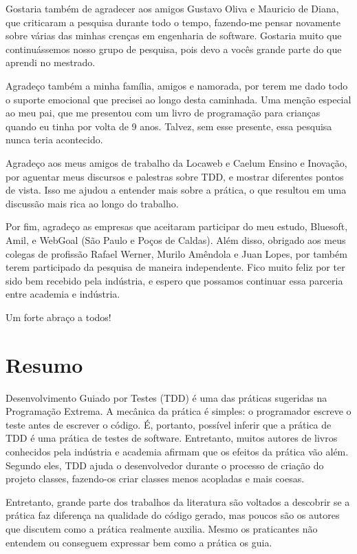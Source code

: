 \documentclass[11pt,openany,twoside,a4paper]{book}
\begin{document}
Gostaria também de agradecer aos amigos Gustavo Oliva e Mauricio de Diana, que
criticaram a pesquisa durante todo o tempo, fazendo-me pensar novamente sobre
várias das minhas crenças em engenharia de software. Gostaria muito que continuássemos
nosso grupo de pesquisa, pois devo a vocês grande parte do que aprendi no mestrado.

Agradeço também a minha família, amigos e namorada, por terem me dado todo o suporte
emocional que precisei ao longo desta caminhada. Uma menção especial ao meu pai,
que me presentou com um livro de programação para crianças quando eu tinha por volta
de 9 anos. Talvez, sem esse presente, essa pesquisa nunca teria acontecido.

Agradeço aos meus amigos de trabalho da Locaweb e Caelum Ensino e Inovação, 
por aguentar meus discursos e palestras sobre TDD, e mostrar diferentes
pontos de vista. Isso me ajudou a entender mais sobre a prática, o que resultou
em uma discussão mais rica ao longo do trabalho.

Por fim, agradeço as empresas que aceitaram participar do meu estudo, Bluesoft,
Amil, e WebGoal (São Paulo e Poços de Caldas). Além disso, obrigado aos meus colegas
de profissão Rafael Werner, Murilo Amêndola e Juan Lopes, por também terem
participado da pesquisa de maneira independente. Fico muito feliz por ter sido
bem recebido pela indústria, e espero que possamos continuar essa parceria entre
academia e indústria.

Um forte abraço a todos!

\chapter*{Resumo}

Desenvolvimento Guiado por Testes (TDD) é uma das práticas sugeridas na Programação
Extrema. A mecânica da prática é simples: o programador escreve o teste antes
de escrever o código. É, portanto, possível inferir que a prática de TDD é uma
prática de testes de software. Entretanto, muitos autores de livros 
conhecidos pela indústria e academia
afirmam que os efeitos da prática vão além. Segundo eles,
TDD ajuda o desenvolvedor durante o processo de criação do projeto classes,
fazendo-os criar classes menos acopladas e mais coesas.

Entretanto, grande parte dos trabalhos da literatura são voltados a descobrir se
a prática faz diferença na qualidade do código gerado, mas poucos são os 
autores que discutem como a prática realmente auxilia.
Mesmo os praticantes não entendem ou conseguem expressar bem como a prática
os guia.
\end{document}
